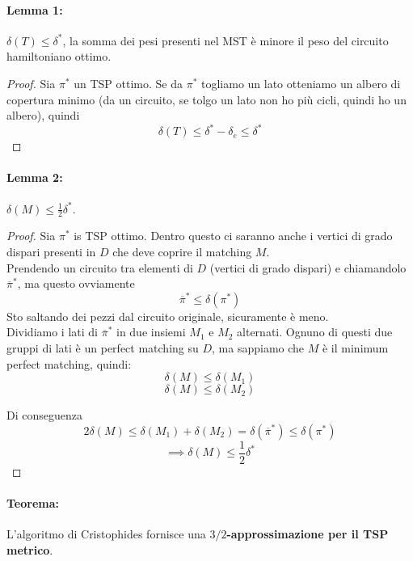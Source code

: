 \newpage

\paragraph{Lemma 1:} $\delta (T) \leq \delta^\ast$, la somma dei pesi presenti nel MST è minore il peso del circuito hamiltoniano ottimo.\\

\begin{proof}
	Sia $\pi^\ast$ un TSP ottimo. Se da $\pi^\ast$ togliamo un lato otteniamo un albero di copertura minimo (da un circuito, se tolgo un lato non ho più cicli, quindi ho un albero), quindi 
	$$ \delta (T) \leq \delta^\ast - \delta_e \leq \delta^\ast $$
\end{proof}

\paragraph{Lemma 2:} $\delta(M) \leq \frac{1}{2} \delta^\ast$.\\

\begin{proof}
	Sia $\pi^\ast$ is TSP ottimo. Dentro questo ci saranno anche i vertici di grado dispari presenti in $D$ che deve coprire il matching $M$.\\
	
	Prendendo un circuito tra elementi di $D$ (vertici di grado dispari) e chiamandolo $\overline{\pi}^\ast$, ma questo ovviamente 
	$$\overline{\pi}^\ast \leq \delta (\pi^\ast) $$
	Sto saltando dei pezzi dal circuito originale, sicuramente è meno.\\
	
	Dividiamo i lati di $\overline{\pi}^\ast$ in due insiemi $M_1$ e $M_2$ alternati. Ognuno di questi due gruppi di lati è un perfect matching su $D$, ma sappiamo che $M$  è il minimum perfect matching, quindi:
	$$ \delta (M) \leq \delta (M_1) $$
	$$ \delta (M) \leq \delta (M_2) $$
	
	Di conseguenza
	$$ 2 \delta (M) \leq \delta (M_1) + \delta (M_2)  = \delta (\overline{\pi}^\ast) \leq \delta (\pi^\ast)$$
	$$ \implies \delta (M) \leq \frac{1}{2} \delta^\ast$$
\end{proof}

\paragraph{Teorema:} L'algoritmo di Cristophides fornisce una \textbf{$3/2$-approssimazione per il TSP metrico}.\\

